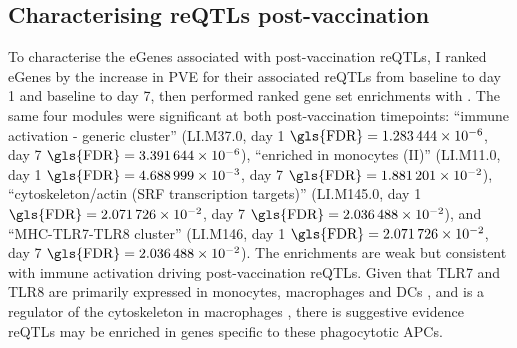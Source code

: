 \subsection{Characterising reQTLs post-vaccination}

To characterise the eGenes associated with post-vaccination \glspl{reQTL},
I ranked eGenes by the increase in \gls{PVE} for their associated \glspl{reQTL} from baseline to day 1 and baseline to day 7,
then performed ranked gene set enrichments with .
%
%
The same four modules were significant at both post-vaccination timepoints:
\enquote{immune activation - generic cluster} (LI.M37.0, day 1 $\text{\gls{FDR}} = \num{1.283444e-06}$, day 7 $\text{\gls{FDR}} = \num{3.391644e-06}$),
\enquote{enriched in monocytes (II)} (LI.M11.0, day 1 $\text{\gls{FDR}} = \num{4.688999e-03}$, day 7 $\text{\gls{FDR}} = \num{1.881201e-02}$),
\enquote{cytoskeleton/actin (SRF transcription targets)} (LI.M145.0, day 1 $\text{\gls{FDR}} = \num{2.071726e-02}$, day 7 $\text{\gls{FDR}} = \num{2.036488e-02}$),
and \enquote{MHC-TLR7-TLR8 cluster} (LI.M146, day 1 $\text{\gls{FDR}} = \num{2.071726e-02}$, day 7 $\text{\gls{FDR}} = \num{2.036488e-02}$).
The enrichments are weak but consistent with immune activation driving post-vaccination \glspl{reQTL}.
Given that TLR7 and TLR8 are primarily expressed in monocytes, macrophages and \glspl{DC} \autocite{cervantes2012TLR8ForgottenRelative},
and  is a regulator of the cytoskeleton in macrophages \autocite{sullivan2011SerumResponseFactor}, 
there is suggestive evidence \glspl{reQTL} may be enriched in genes specific to these phagocytotic \glspl{APC}.

